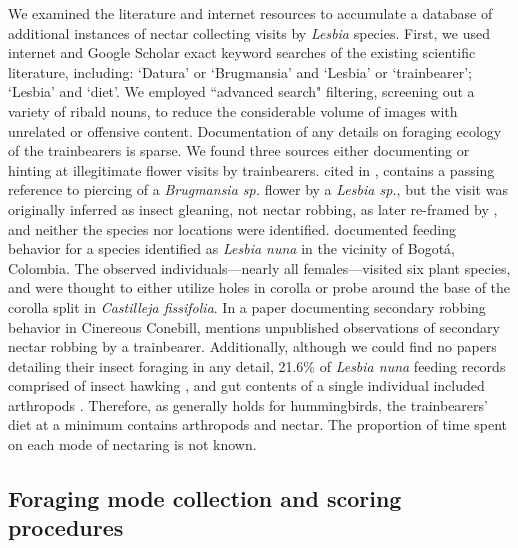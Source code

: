\documentclass[fleqn,10pt,lineno]{wlpeerj}
\begin{document}
We examined the literature and internet resources to accumulate a database of additional instances of nectar collecting visits by \textit{Lesbia} species. 
First, we used internet and Google Scholar exact keyword searches of the existing scientific literature, including: `Datura' or `Brugmansia' and `Lesbia' or `trainbearer'; `Lesbia' and  `diet'. 
We employed ``advanced search" filtering, screening out a variety of ribald nouns, to reduce the considerable volume of images with unrelated or offensive content.
Documentation of any details on foraging ecology of the trainbearers is sparse. 
We found three sources either documenting or hinting at illegitimate flower visits by trainbearers. \citet[p.15]{gould1861} cited in \citet{ornelas1994}, contains a passing reference to piercing of a \textit{Brugmansia sp.} flower by a \textit{Lesbia sp.}, but the visit was originally inferred as insect gleaning, not nectar robbing, as later re-framed by \citet{ornelas1994}, and neither the species nor locations were identified. 
\citet{snow1980} documented feeding behavior for a species identified as \textit{Lesbia nuna} in the vicinity of Bogot\'a, Colombia. 
The observed individuals---nearly all females---visited six plant species, and were thought to either utilize holes in corolla or probe around the base of the corolla split in \textit{Castilleja fissifolia}.
In a paper documenting secondary robbing behavior in Cinereous Conebill, \citet{vogt2006} mentions unpublished observations of secondary nectar robbing by a trainbearer. %
Additionally, although we could find no papers detailing their insect foraging in any detail, 21.6\% of \textit{Lesbia nuna} feeding records comprised of insect hawking \citep{snow1980}, and gut contents of a single individual included arthropods \citep{remsen1986}.
Therefore, as generally holds for hummingbirds, the trainbearers' diet at a minimum contains arthropods and nectar.
The proportion of time spent on each mode of nectaring is not known.

\subsection*{Foraging mode collection and scoring procedures}
\end{document}
